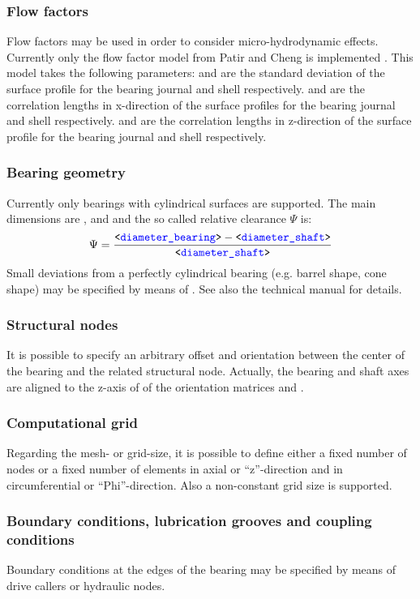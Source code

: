 \subsubsection{Flow factors}
Flow factors may be used in order to consider micro-hydrodynamic effects. Currently only the flow factor model from Patir and Cheng is implemented \cite{PatirCheng1978}. This model takes the following parameters:  and  are the standard deviation of the surface profile for the bearing journal and shell respectively.  and  are the correlation lengths in x-direction of the surface profiles for the bearing journal and shell respectively.  and  are the correlation lengths in z-direction of the surface profile for the bearing journal and shell respectively.
\subsubsection{Bearing geometry}
Currently only bearings with cylindrical surfaces are supported. The main dimensions are ,  and  and the so called relative clearance $\Psi$ is:
\begin{equation}
\Psi=\frac{\texttt{<\textcolor{blue}{diameter\_bearing}>} - \texttt{<\textcolor{blue}{diameter\_shaft}>}}{\texttt{<\textcolor{blue}{diameter\_shaft}>}}
\end{equation}
Small deviations from a perfectly cylindrical bearing (e.g. barrel shape, cone shape) may be specified by means of . See also the technical manual for details.
\subsubsection{Structural nodes}
It is possible to specify an arbitrary offset and orientation between the center of the bearing and the related structural node. Actually, the bearing and shaft axes are aligned to the z-axis of of the orientation matrices  and .
\subsubsection{Computational grid}
Regarding the mesh- or grid-size, it is possible to define either a fixed number of nodes or a fixed number of elements in axial or ``z''-direction and in circumferential or ``Phi''-direction. Also a non-constant grid size is supported.
\subsubsection{Boundary conditions, lubrication grooves and coupling conditions}
Boundary conditions at the edges of the bearing may be specified by means of drive callers or hydraulic nodes.
